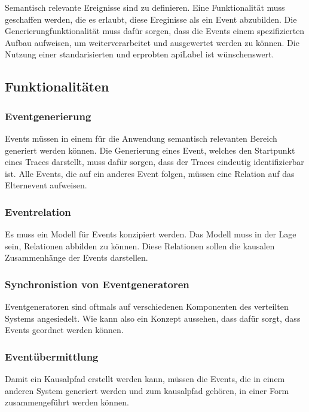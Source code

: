 Semantisch relevante Ereignisse sind zu definieren. Eine Funktionalität muss geschaffen werden, die es erlaubt, diese Ereginisse als ein Event abzubilden. Die Generierungfunktionalität muss dafür sorgen, dass die Events einem spezifizierten Aufbau aufweisen, um weiterverarbeitet und ausgewertet werden zu können. Die Nutzung einer standarisierten und erprobten \gls{apiLabel} ist wünschenswert.
 
\subsection{Funktionalitäten}

\subsubsection{Eventgenerierung}
\label{subsubsection:Eventgenerierung}
Events müssen in einem für die Anwendung semantisch relevanten Bereich generiert werden können. Die Generierung eines Event, welches den Startpunkt eines Traces darstellt, muss dafür sorgen, dass der Traces eindeutig identifizierbar ist. Alle Events, die auf ein anderes Event folgen, müssen eine Relation auf das Elternevent aufweisen.

\subsubsection{Eventrelation}
\label{subsubsection:Eventkorrelation}
Es muss ein Modell für Events konzipiert werden. Das Modell muss in der Lage sein, Relationen abbilden zu können. Diese Relationen sollen die kausalen Zusammenhänge der Events darstellen. 

\subsubsection{Synchronistion von Eventgeneratoren}
\label{subsubsection:Synchronistion von Eventgeneratoren}
Eventgeneratoren sind oftmals auf verschiedenen Komponenten des verteilten Systems angesiedelt. Wie kann also ein Konzept aussehen, dass dafür sorgt, dass Events geordnet werden können.

\subsubsection{Eventübermittlung}
\label{subsubsection:Eventübermittlung}
Damit ein Kausalpfad erstellt werden kann, müssen die Events, die in einem anderen System generiert werden und zum kausalpfad gehören, in einer Form zusammengeführt werden können.

